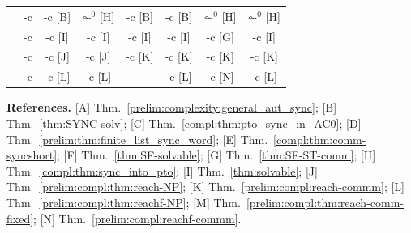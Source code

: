 \begin{table}[htb]
\begin{tabular}{l|c|c|c|cc|cc|}
		\SIS
		& \cg\PSPACE-c
		& \cd\LOGSPACE-c [B]
		& \cd$\AC^0$ [H]
		& \cd\LOGSPACE-c [B]
		& \cd\LOGSPACE-c [B]
		& \cd$\AC^0$ [H]
		& \cd$\AC^0$ [H]
		\\
		
		\ST
		& \cg\PSPACE-c
		& \cd\NP-c [I]
		& \cg\NP-c [I]
		& \cg\NP-c [I]
		& \cg\NP-c [I]
		& \cd\LOGSPACE-c [G]
		& \cg\NP-c [I]
		\\
		
		\REACH
		& \cg\PSPACE-c
		& \cd\NP-c [J]
		& \cg\NP-c [J]
		& \cd\LOGSPACE-c [K]
		& \cd\NP-c [K]
		& \cd\LOGSPACE-c [K]
		& \cd\LOGSPACE-c [K]
		\\
		
		\REACHF
		& \cg\PSPACE-c
		& \cd\NP-c [L]
		& \cd\NP-c [L]
		& \cd\PTIME [M]
		& \cd\NP-c [L]
		& \cd\LOGSPACE-c [N]
		& \cd\NP-c [L]
		\\ \hline
		
	\end{tabular}
	
	\vspace{0.5em}
	
	\begin{minipage}{0.98\linewidth}
		\footnotesize
		\textbf{References.}
		[A] Thm.~\ref{prelim:complexity:general_aut_sync};
		[B] Thm.~\ref{thm:SYNC-solv};
		[C] Thm.~\ref{compl:thm:pto_sync_in_AC0};
		[D] Thm.~\ref{prelim:thm:finite_list_sync_word};
		[E] Thm.~\ref{compl:thm:comm-syncshort};
		[F] Thm.~\ref{thm:SF-solvable};
		[G] Thm.~\ref{thm:SF-ST-comm};
		[H] Thm.~\ref{compl:thm:sync_into_pto};
		[I] Thm.~\ref{thm:solvable};
		[J] Thm.~\ref{prelim:compl:thm:reach-NP};
		[K] Thm.~\ref{prelim:compl:reach-commm};
		[L] Thm.~\ref{prelim:compl:thm:reachf-NP};
		[M] Thm.~\ref{prelim:compl:thm:reach-comm-fixed};
		[N] Thm.~\ref{prelim:compl:reachf-commm}.
	\end{minipage}
	
	\label{compl:tab:overview}
\end{table}